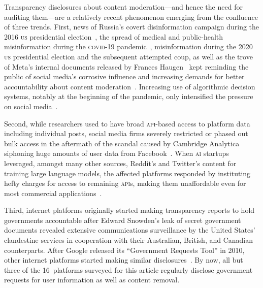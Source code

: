 \documentclass[nonacm,screen]{acmart}
\newcommand\V[1]{\textsc{\MakeLowercase{#1}}}
\begin{document}
Transparency disclosures about content moderation---and hence the need for
auditing them---are a relatively recent phenomenon emerging from the confluence
of three trends. First, news of Russia's covert disinformation campaign during
the 2016 \V{US} presidential election~\cite{Francoisdouek2021}, the spread of
medical and public-health misinformation during the \V{COVID-19}
pandemic~\cite{ChoLiea2023,FoleyGurakar2022,GreenhalghOzbilginea2022},
misinformation during the 2020 \V{US} presidential election and the subsequent
attempted coup, as well as the trove of Meta's internal documents released by
Frances Haugen~\cite{CameronWodinskyea2023,ElliottChristopherea2021} kept
reminding the public of social media's corrosive influence and increasing
demands for better accountability about content
moderation~\cite{HaimsonDelmonacoea2021,KozyrevaHerzogea2023}. Increasing use of
algorithmic decision systems, notably at the beginning of the pandemic, only
intensified the pressure on social media~\cite{ScottKayali2020}.

Second, while researchers used to have broad \V{API}-based access to platform
data including individual posts, social media firms severely restricted or
phased out bulk access in the aftermath of the scandal caused by Cambridge
Analytica siphoning huge amounts of user data from
Facebook~\cite{Bruns2019,Puschmann2019,WalkerMerceaea2019}. When \V{AI} startups
leveraged, amongst many other sources, Reddit's and Twitter's content for
training large language models, the affected platforms responded by instituting
hefty charges for access to remaining \V{API}s, making them unaffordable even
for most commercial applications~\cite{Isaac2023}.

Third, internet platforms originally started making transparency reports to hold
governments accountable after Edward Snowden's leak of secret government
documents revealed extensive communications surveillance by the United States'
clandestine services in cooperation with their Australian, British, and Canadian
counterparts. After Google released its ``Government Requests Tool'' in 2010,
other internet platforms started making similar
disclosures~\cite{TrustSafetyProfessionalAssociation2022}. By now, all but three
of the 16~platforms surveyed for this article regularly disclose government
requests for user information as well as content removal.
\end{document}
